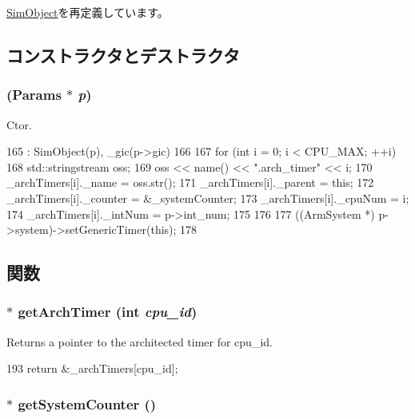 \hyperlink{classSimObject_a0f0761d2db586a23bb2a2880b8f387bb}{SimObject}を再定義しています。

\subsection{コンストラクタとデストラクタ}
\hypertarget{classGenericTimer_ab181001a27fc011ac7f4cf037355fe52}{
\subsubsection[{GenericTimer}]{ ({\bf Params} $\ast$ {\em p})}}
\label{classGenericTimer_ab181001a27fc011ac7f4cf037355fe52}


Ctor. 


\begin{DoxyCode}
165     : SimObject(p), _gic(p->gic)
166 {
167    for (int i = 0; i < CPU_MAX; ++i) {
168         std::stringstream oss;
169         oss << name() << ".arch_timer" << i;
170         _archTimers[i]._name = oss.str();
171         _archTimers[i]._parent = this;
172         _archTimers[i]._counter = &_systemCounter;
173         _archTimers[i]._cpuNum = i;
174         _archTimers[i]._intNum = p->int_num;
175    }
176 
177    ((ArmSystem *) p->system)->setGenericTimer(this);
178 }
\end{DoxyCode}


\subsection{関数}
\hypertarget{classGenericTimer_a29c0ab5dcf6b80bda0bcab1529bbdb12}{
\subsubsection[{getArchTimer}]{$\ast$ getArchTimer (int {\em cpu\_\-id})}}
\label{classGenericTimer_a29c0ab5dcf6b80bda0bcab1529bbdb12}


Returns a pointer to the architected timer for cpu\_\-id. 


\begin{DoxyCode}
193 { return &_archTimers[cpu_id]; }
\end{DoxyCode}
\hypertarget{classGenericTimer_aa2f9dd95a2e3e767b4f84eb8f3fe1b3c}{
\subsubsection[{getSystemCounter}]{$\ast$ getSystemCounter ()}}
\label{classGenericTimer_aa2f9dd95a2e3e767b4f84eb8f3fe1b3c}


